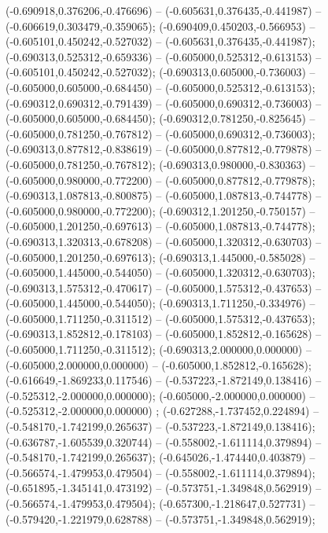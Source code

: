 (-0.690918,0.376206,-0.476696) -- (-0.605631,0.376435,-0.441987) -- (-0.606619,0.303479,-0.359065);
 (-0.690409,0.450203,-0.566953) -- (-0.605101,0.450242,-0.527032) -- (-0.605631,0.376435,-0.441987);
 (-0.690313,0.525312,-0.659336) -- (-0.605000,0.525312,-0.613153) -- (-0.605101,0.450242,-0.527032);
 (-0.690313,0.605000,-0.736003) -- (-0.605000,0.605000,-0.684450) -- (-0.605000,0.525312,-0.613153);
 (-0.690312,0.690312,-0.791439) -- (-0.605000,0.690312,-0.736003) -- (-0.605000,0.605000,-0.684450);
 (-0.690312,0.781250,-0.825645) -- (-0.605000,0.781250,-0.767812) -- (-0.605000,0.690312,-0.736003);
 (-0.690313,0.877812,-0.838619) -- (-0.605000,0.877812,-0.779878) -- (-0.605000,0.781250,-0.767812);
 (-0.690313,0.980000,-0.830363) -- (-0.605000,0.980000,-0.772200) -- (-0.605000,0.877812,-0.779878);
 (-0.690313,1.087813,-0.800875) -- (-0.605000,1.087813,-0.744778) -- (-0.605000,0.980000,-0.772200);
 (-0.690312,1.201250,-0.750157) -- (-0.605000,1.201250,-0.697613) -- (-0.605000,1.087813,-0.744778);
 (-0.690313,1.320313,-0.678208) -- (-0.605000,1.320312,-0.630703) -- (-0.605000,1.201250,-0.697613);
 (-0.690313,1.445000,-0.585028) -- (-0.605000,1.445000,-0.544050) -- (-0.605000,1.320312,-0.630703);
 (-0.690313,1.575312,-0.470617) -- (-0.605000,1.575312,-0.437653) -- (-0.605000,1.445000,-0.544050);
 (-0.690313,1.711250,-0.334976) -- (-0.605000,1.711250,-0.311512) -- (-0.605000,1.575312,-0.437653);
 (-0.690313,1.852812,-0.178103) -- (-0.605000,1.852812,-0.165628) -- (-0.605000,1.711250,-0.311512);
 (-0.690313,2.000000,0.000000) -- (-0.605000,2.000000,0.000000) -- (-0.605000,1.852812,-0.165628);
 (-0.616649,-1.869233,0.117546) -- (-0.537223,-1.872149,0.138416) -- (-0.525312,-2.000000,0.000000);
 (-0.605000,-2.000000,0.000000) -- (-0.525312,-2.000000,0.000000) ;
 (-0.627288,-1.737452,0.224894) -- (-0.548170,-1.742199,0.265637) -- (-0.537223,-1.872149,0.138416);
 (-0.636787,-1.605539,0.320744) -- (-0.558002,-1.611114,0.379894) -- (-0.548170,-1.742199,0.265637);
 (-0.645026,-1.474440,0.403879) -- (-0.566574,-1.479953,0.479504) -- (-0.558002,-1.611114,0.379894);
 (-0.651895,-1.345141,0.473192) -- (-0.573751,-1.349848,0.562919) -- (-0.566574,-1.479953,0.479504);
 (-0.657300,-1.218647,0.527731) -- (-0.579420,-1.221979,0.628788) -- (-0.573751,-1.349848,0.562919);
